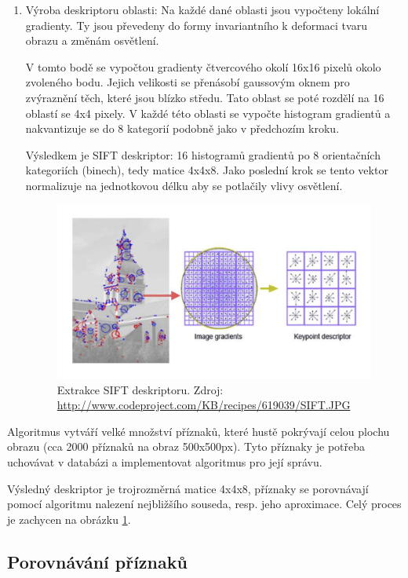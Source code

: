 \begin{enumerate}
		\item Výroba deskriptoru oblasti: Na každé dané oblasti jsou vypočteny lokální gradienty. Ty jsou převedeny do formy invariantního k deformaci tvaru obrazu a změnám osvětlení.
		
			V tomto bodě se vypočtou gradienty čtvercového okolí 16x16 pixelů okolo zvoleného bodu. Jejich velikosti se přenásobí gaussovým oknem pro zvýraznění těch, které jsou blízko středu. Tato oblast se poté rozdělí na 16 oblastí se 4x4 pixely. V každé této oblasti se vypočte histogram gradientů a nakvantizuje se do 8 kategorií podobně jako v předchozím kroku.
			
			Výsledkem je SIFT deskriptor: 16 histogramů gradientů po 8 orientačních kategoriích (binech), tedy matice 4x4x8. Jako poslední krok se tento vektor normalizuje na jednotkovou délku aby se potlačily vlivy osvětlení. 
			
			\begin{figure}[!ht] 
				\centering
					\includegraphics[width=5in]{img/sift_kp.png}
				\caption{Extrakce SIFT deskriptoru. Zdroj: \protect\url{http://www.codeproject.com/KB/recipes/619039/SIFT.JPG}} 	\label{sift_kp}
			\end{figure}
			
	\end{enumerate}
	
	Algoritmus vytváří velké množství příznaků, které hustě pokrývají celou plochu obrazu (cca 2000 příznaků na obraz 500x500px). Tyto příznaky je potřeba uchovávat v databázi a implementovat algoritmus pro její správu.
	
	Výsledný deskriptor je trojrozměrná matice 4x4x8, příznaky se porovnávají pomocí algoritmu nalezení nejbližšího souseda, resp. jeho aproximace. Celý proces je zachycen na obrázku \ref{sift_kp}.
	
	\subsection{Porovnávání příznaků}
	
